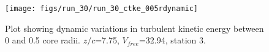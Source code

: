 \begin{figure}[H]
\centering
\texttt{[image: figs/run\_30/run\_30\_ctke\_005rdynamic]}
\caption{Plot showing dynamic variations in turbulent kinetic energy between 0 and 0.5 core radii. $z/c$=7.75, $V_{free}$=32.94, station 3.}
\label{fig:run_30_ctke_005rdynamic}
\end{figure}


